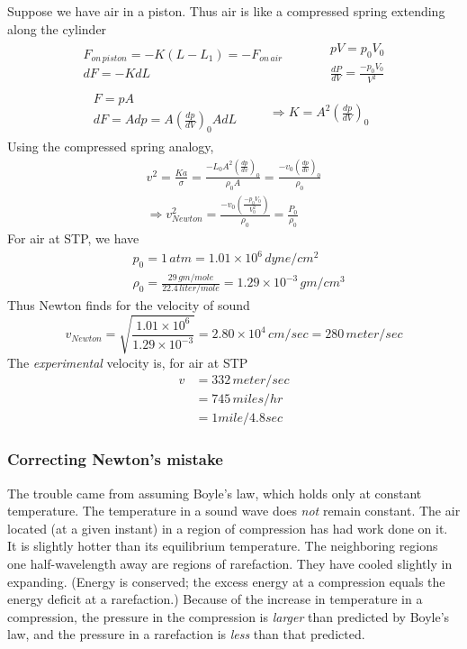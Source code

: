 \documentclass[twoside, 10pt]{amsart}
\begin{document}
Suppose we have air in a piston.  Thus air is like a compressed spring extending along the cylinder 
\[
\begin{gathered}
  \begin{gathered}
    F_{on \, piston} = -K(L - L_1) = -F_{on \, air} \\
    dF = -K dL
  \end{gathered} \quad \quad \, 
  \begin{aligned}
    & pV = p_0 V_0 \\
    & \frac{dP}{dV} = \frac{- p_0 V_0 }{ V^2 }
  \end{aligned} \\
  \begin{aligned}
    & F = pA \\
    & dF = A dp = A \left( \frac{dp}{dV} \right)_0 A dL 
  \end{aligned} \quad \quad \, \Longrightarrow K = A^2 \left( \frac{dp}{dV} \right)_0
\end{gathered}
\]
Using the compressed spring analogy,
\[
\begin{gathered}
  v^2 = \frac{Ka}{\sigma} = \frac{- L_0 A^2 \left( \frac{dp}{dv} \right)_0 }{ \rho_0 A} = \frac{ -v_0 \left( \frac{dp}{dv} \right)_0 }{ \rho_0 } \\
  \Longrightarrow v_{Newton}^2 = \frac{ -v_0 \left( \frac{-p_0 V_0}{V_0^2 } \right) }{ \rho_0} = \frac{P_0}{\rho_0}
\end{gathered}
\]
For air at STP, we have 
\[
\begin{aligned}
  & p_0 = 1 \, atm = 1.01 \times 10^6 \, dyne/cm^2 \\
  & \rho_0 = \frac{ 29 \, gm/mole }{ 22.4 \, liter/mole } = 1.29 \times 10^{-3} \, gm/cm^3 
\end{aligned}
\]
Thus Newton finds for the velocity of sound
\[
v_{Newton} = \sqrt{ \frac{ 1.01 \times 10^6}{ 1.29 \times 10^{-3}} } = 2.80 \times 10^4 \, cm/sec = 280 \, meter/sec 
\]
The \emph{experimental} velocity is, for air at STP
\[
\begin{aligned}
  v & = 332 \, meter/sec \\
  & = 745 \, miles/hr \\
  & = 1 mile/4.8 sec
\end{aligned}
\]
\subsubsection*{ Correcting Newton's mistake }
The trouble came from assuming Boyle's law, which holds only at constant temperature.  The temperature in a sound wave does \emph{not} remain constant.  The air located (at a given instant) in a region of compression has had work done on it.  It is slightly hotter than its equilibrium temperature.  The neighboring regions one half-wavelength away are regions of rarefaction.  They have cooled slightly in expanding.  (Energy is conserved; the excess energy at a compression equals the energy deficit at a rarefaction.)  Because of the increase in temperature in a compression, the pressure in the compression is \emph{larger} than predicted by Boyle's law, and the pressure in a rarefaction is \emph{less} than that predicted.  
\end{document}
